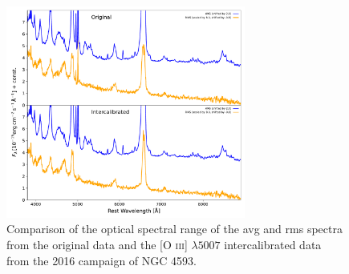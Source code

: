 \begin{figure}[!ht]
	\centering
	\includegraphics[width=0.7\textwidth]{pictures/Chapter3/comparison_avg_rms}
	\caption{Comparison of the optical spectral range of the avg and rms spectra from the original data and the [O \textsc{iii}] $\lambda5007$ intercalibrated data from the 2016 campaign of NGC 4593.}
	\label{fig:comparison_spectra_avg_rms}
\end{figure}



